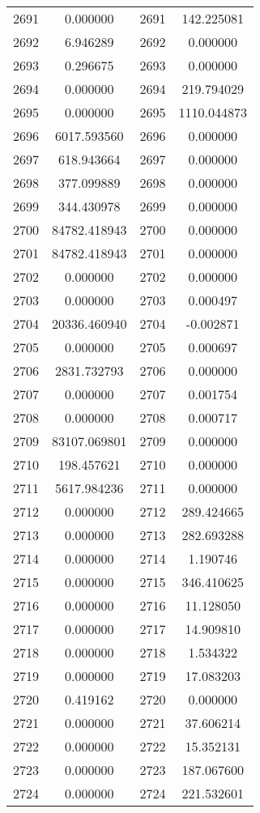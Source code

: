 \documentclass[12pt]{article}
\begin{document}
\begin{longtable}{@{}cccc@{}}
2691 & 0.000000 & 2691 & 142.225081 \\
2692 & 6.946289 & 2692 & 0.000000 \\
2693 & 0.296675 & 2693 & 0.000000 \\
2694 & 0.000000 & 2694 & 219.794029 \\
2695 & 0.000000 & 2695 & 1110.044873 \\
2696 & 6017.593560 & 2696 & 0.000000 \\
2697 & 618.943664 & 2697 & 0.000000 \\
2698 & 377.099889 & 2698 & 0.000000 \\
2699 & 344.430978 & 2699 & 0.000000 \\
2700 & 84782.418943 & 2700 & 0.000000 \\
2701 & 84782.418943 & 2701 & 0.000000 \\
2702 & 0.000000 & 2702 & 0.000000 \\
2703 & 0.000000 & 2703 & 0.000497 \\
2704 & 20336.460940 & 2704 & -0.002871 \\
2705 & 0.000000 & 2705 & 0.000697 \\
2706 & 2831.732793 & 2706 & 0.000000 \\
2707 & 0.000000 & 2707 & 0.001754 \\
2708 & 0.000000 & 2708 & 0.000717 \\
2709 & 83107.069801 & 2709 & 0.000000 \\
2710 & 198.457621 & 2710 & 0.000000 \\
2711 & 5617.984236 & 2711 & 0.000000 \\
2712 & 0.000000 & 2712 & 289.424665 \\
2713 & 0.000000 & 2713 & 282.693288 \\
2714 & 0.000000 & 2714 & 1.190746 \\
2715 & 0.000000 & 2715 & 346.410625 \\
2716 & 0.000000 & 2716 & 11.128050 \\
2717 & 0.000000 & 2717 & 14.909810 \\
2718 & 0.000000 & 2718 & 1.534322 \\
2719 & 0.000000 & 2719 & 17.083203 \\
2720 & 0.419162 & 2720 & 0.000000 \\
2721 & 0.000000 & 2721 & 37.606214 \\
2722 & 0.000000 & 2722 & 15.352131 \\
2723 & 0.000000 & 2723 & 187.067600 \\
2724 & 0.000000 & 2724 & 221.532601 \\

\end{longtable}
\end{document}

